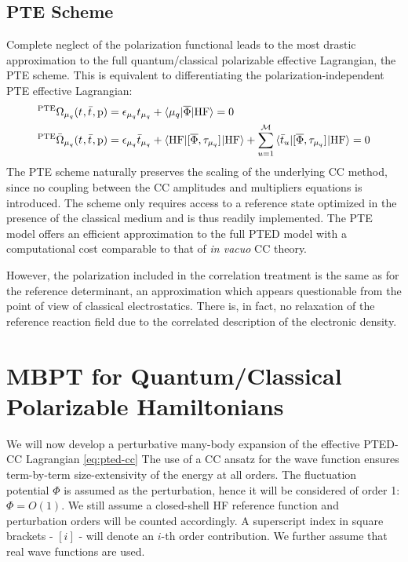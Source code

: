 \subsection*{PTE Scheme}

Complete neglect of the polarization functional leads to the most
drastic approximation to the full quantum/classical polarizable
effective Lagrangian, the \acrshort{PTE} scheme.
This is equivalent to differentiating the polarization-independent
\acrshort{PTE} effective Lagrangian:
\begin{subequations}
  \begin{align}
 {}^{\mathrm{PTE}}\Omega_{\mu_q}(t_{}, \bar{t}_{}, \mathrm{p})  &=
   \epsilon_{\mu_q}t_{\mu_q} + \braket{\mu_q | \overline{\Phi} | \mathrm{HF}}
    = 0 \\
   {}^{\mathrm{PTE}}\bar{\Omega}_{\mu_q}(t_{}, \bar{t}_{}, \mathrm{p})
    &=
    \epsilon_{\mu_q}\bar{t}_{\mu_q} +
    \braket{\mathrm{HF} | [ \overline{\Phi}, \tau_{\mu_q} ]^{} | \mathrm{HF}} +
    \sum_{u=1}^{\mathcal{M}}\braket{\bar{t}_{u} |
    [ \overline{\Phi}, \tau_{\mu_q} ]^{} | \mathrm{HF}}
    = 0
  \end{align}
\end{subequations}
The \acrshort{PTE} scheme naturally preserves the scaling of the underlying
\acrshort{CC} method, since no coupling between the \acrshort{CC} amplitudes and
multipliers equations is introduced.
The scheme only requires access to a
reference state optimized in the presence of the classical medium and is
thus readily implemented.
The \acrshort{PTE} model offers an efficient approximation to the full
\acrshort{PTED} model with a computational cost comparable to that of
\emph{in vacuo} \acrshort{CC}
theory.\autocite{Olivares_del_Valle1991-of, Begue2005-qn,
Hasegawa2007-jt}

However, the polarization included in the correlation treatment is the
same as for the reference determinant, an approximation which appears
questionable from the point of view of classical electrostatics. There
is, in fact, no relaxation of the reference reaction field due to the
correlated description of the electronic density.

\section[MBPT for Quantum/Classical Polarizable Hamiltonians]{
MBPT for Quantum/Classical Polarizable Hamiltonians}\label{sec:mbpt-polarizable}

We will now develop a perturbative many-body expansion of the effective
\acrshort{PTED}-\acrshort{CC} Lagrangian \eqref{eq:pted-cc}
The use of a \acrshort{CC} ansatz for the wave function ensures term-by-term
size-extensivity of the energy at all orders.\autocite{Helgaker2000-tz}
The fluctuation potential $\Phi$ is assumed as the perturbation, hence
it will be considered of order 1: $\Phi = O(1)$.
We still assume a closed-shell \acrshort{HF} reference function and
perturbation orders will be counted accordingly.
A superscript index in square brackets - $[i]$ -  will denote an $i$-th
order contribution.
We further assume that real wave functions are used.

